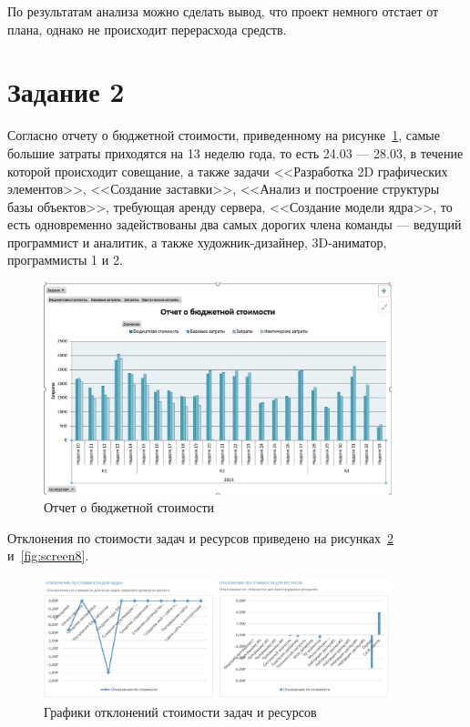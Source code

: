 По результатам анализа можно сделать вывод, что проект немного отстает от плана, однако не происходит перерасхода средств.

\section{Задание 2}

Согласно отчету о бюджетной стоимости, приведенному на рисунке~\ref{fig:screen6}, самые большие затраты приходятся на 13 неделю года, то есть 24.03 --- 28.03, в течение которой происходит совещание, а также задачи <<Разработка 2D графических элементов>>, <<Создание заставки>>, <<Анализ и построение структуры базы объектов>>, требующая аренду сервера, <<Создание модели ядра>>, то есть одновременно задействованы два самых дорогих члена команды --- ведущий программист и аналитик, а также художник-дизайнер, 3D-аниматор, программисты 1 и 2.

\begin{figure}[H]
	\centering
	\includegraphics[width=0.9\textwidth]{img/screen3.jpg}
	\caption{Отчет о бюджетной стоимости}
	\label{fig:screen6}
\end{figure}

Отклонения по стоимости задач и ресурсов приведено на рисунках~\ref{fig:screen7} и~\ref{fig:screen8}.

\begin{figure}[H]
	\centering
	\includegraphics[width=0.9\textwidth]{img/screen4_2.jpg}
	\caption{Графики отклонений стоимости задач и ресурсов}
	\label{fig:screen7}
\end{figure}

